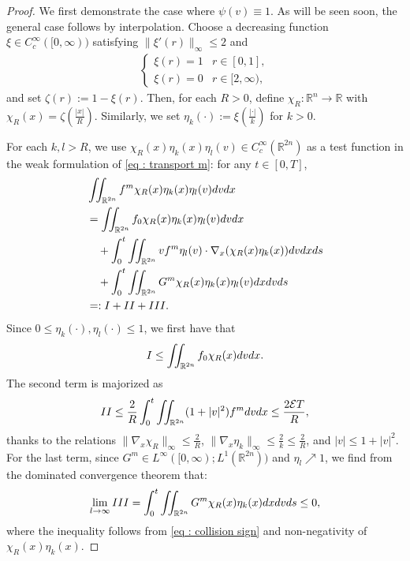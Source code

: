 \documentclass{amsart}
\theoremstyle{plain}
\theoremstyle{remark}
\numberwithin{equation}{section}
\newcommand{\calE}{\mathcal E}
\newcommand{\R}{\mathbb{R}}
\newcommand{\dx}{\textnormal{d}x}
\newcommand{\dv}{\textnormal{d}v}
\newcommand{\ds}{\textnormal{d}s}
\newcommand{\lt}{\left}
\newcommand{\rt}{\right}
\newcommand{\intr}{\int_{\R^n}}
\begin{document}
\begin{proof}
We first demonstrate the case where $\psi(v) \equiv 1$. As will be seen soon, the general case follows by interpolation.
Choose a decreasing function $\xi \in C_c^\infty([0,\infty))$ satisfying $\|\xi'(r)\|_\infty \le 2$ and
\begin{align*}
\begin{cases}
    \xi(r) = 1  &  r \in [0,1],\\
    \xi(r) = 0  &   r \in [2,\infty),
    \end{cases}
\end{align*}
and set $\zeta(r):= 1- \xi(r)$. Then, for each $R>0$, define $\chi_R:\R^n\to\R$ with $\chi_R(x) = \zeta\left(\frac{|x|}{R}\right)$. Similarly, we set $\eta_k(\cdot):= \xi\lt(\frac{|\cdot|}{k}\rt)$ for $k>0$.

For each $k,l>R$, we use $\chi_R(x)\eta_k(x)\eta_l(v) \in C_c^\infty(\R^{2n})$ as a test function in the weak formulation of \eqref{eq : transport m}: for any $t \in [0,T]$,
\begin{equation}\label{eq: form ftc}
\begin{split}
    &\iint_{\R^{2n}} f^m \chi_R(x)\eta_k(x)\eta_l(v)\dv\dx  \\
    &= \iint_{\R^{2n}} f_0 \chi_R(x)\eta_k(x)\eta_l(v)\dv\dx \\
    &\quad +  \int_0^t\iint_{\R^{2n}} v f^m \eta_l(v) \cdot \nabla_x (\chi_R(x)\eta_k(x)) \dv\dx \ds\\
    &\quad + \int_0^t\iint_{\R^{2n}} G^m  \chi_R(x)\eta_k(x) \eta_l(v)\dx\dv\ds \\
    &=: I + II + III.
\end{split}
\end{equation}
Since $0 \le \eta_k(\cdot), \eta_l(\cdot) \le 1$, we first have that
\[
I \le \iint_{\R^{2n}} f_0 \chi_R(x)\dv\dx .
\]
The second term is majorized as
\[
II \le \frac{2}{R}\int_0^t \iint_{\R^{2n}} (1+|v|^2)f^m \dv\dx \le \frac{2\calE T}{R},
\]
thanks to the relations $\|\nabla_x\chi_R\|_{\infty} \le \frac{2}{R}$, $\|\nabla_x\eta_k\|_\infty \le \frac{2}{k}\le \frac{2}{R}$, and $|v| \le 1 + |v|^2$. For the last term, since $G^m \in L^\infty([0,\infty);L^1(\R^{2n}))$ and $\eta_l \nearrow 1$, we find from the dominated convergence theorem that:
\[
\lim_{l \to \infty} III =  \int_0^t\iint_{\R^{2n}}  G^m \chi_R(x)\eta_k(x)\dx\dv\ds \le 0,
\]
where the inequality follows from  \eqref{eq : collision sign} and non-negativity of $\chi_R(x) \eta_k(x)$.


\end{proof}
\end{document}
